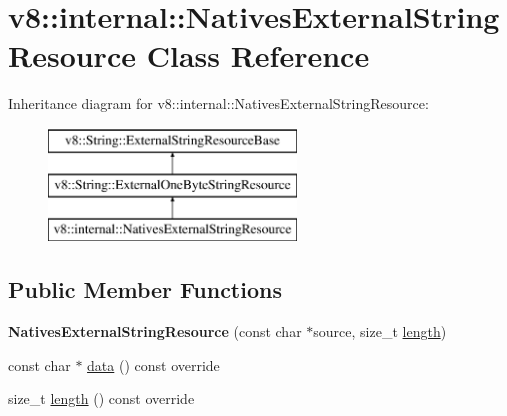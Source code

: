 \hypertarget{classv8_1_1internal_1_1_natives_external_string_resource}{}\section{v8\+:\+:internal\+:\+:Natives\+External\+String\+Resource Class Reference}
\label{classv8_1_1internal_1_1_natives_external_string_resource}
Inheritance diagram for v8\+:\+:internal\+:\+:Natives\+External\+String\+Resource\+:\begin{figure}[H]
\begin{center}
\leavevmode
\includegraphics[height=3.000000cm]{classv8_1_1internal_1_1_natives_external_string_resource}
\end{center}
\end{figure}
\subsection*{Public Member Functions}
\begin{DoxyCompactItemize}
\item 
{\bfseries Natives\+External\+String\+Resource} (const char $\ast$source, size\+\_\+t \hyperlink{classv8_1_1internal_1_1_natives_external_string_resource_adf9b2887776410671dfb32353e0d227e}{length})\hypertarget{classv8_1_1internal_1_1_natives_external_string_resource_a5ef4c50620117e9e2e063caa864c9201}{}\label{classv8_1_1internal_1_1_natives_external_string_resource_a5ef4c50620117e9e2e063caa864c9201}

\item 
const char $\ast$ \hyperlink{classv8_1_1internal_1_1_natives_external_string_resource_a14cd7f1c97e77da7265ef71613b80e04}{data} () const  override
\item 
size\+\_\+t \hyperlink{classv8_1_1internal_1_1_natives_external_string_resource_adf9b2887776410671dfb32353e0d227e}{length} () const  override
\end{DoxyCompactItemize}
